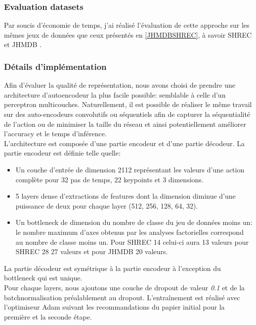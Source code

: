 \subsubsection{Evaluation datasets}
Par soucis d'économie de temps, j'ai réalisé l'évaluation de cette approche sur les mêmes jeux de données que ceux présentés en \ref{JHMDBSHREC}, à savoir SHREC \cite{de2017shrec} et JHMDB \cite{jhuang2013towards}.\\

\subsubsection{Détails d'implémentation}

Afin d'évaluer la qualité de représentation, nous avons choisi de prendre une architecture d'autoencodeur la plus facile possible: semblable à celle d'un perceptron multicouches. Naturellement, il est possible de réaliser le même travail sur des auto-encodeurs convolutifs ou séquentiels afin de capturer la séquentialité de l'action ou de minimiser la taille du réseau et ainsi potentiellement améliorer l'accuracy et le temps d'inférence.\\

L'architecture est composée d'une partie encodeur et d'une partie décodeur.
La partie encodeur est définie telle quelle:
\begin{itemize}
    \item Un couche d'entrée de dimension 2112 représentant les valeurs d'une action complète pour 32 pas de temps, 22 keypoints et  3 dimensions.
    \item 5 layers dense d'extractions de features dont la dimension diminue d'une puissance de deux pour chaque layer (512, 256, 128, 64, 32).
    \item Un bottleneck de dimension du nombre de classe du jeu de données moins un: le nombre maximum d'axes obtenus par les analyses factorielles correspond au nombre de classe moins un. Pour SHREC 14 celui-ci aura 13 valeurs pour SHREC 28 27 valeurs et pour JHMDB 20 valeurs.
\end{itemize}

La partie décodeur est symétrique à la partie encodeur à l'exception du bottleneck qui est unique.\\
Pour chaque layers, nous ajoutons une couche de dropout de valeur \textit{0.1} et de la batchnormalisation préalablement au dropout.
L’entraînement est réalisé avec l'optimiseur Adam \cite{kingma2014adam} suivant les recommandations du papier initial pour la première et la seconde étape.\\

